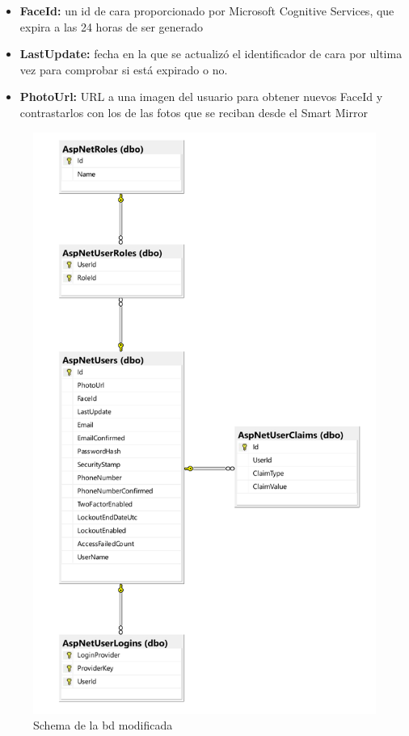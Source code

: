 \begin{itemize}
\item \textbf{FaceId:} un id de cara proporcionado por Microsoft Cognitive Services, que expira a las 24 horas de ser generado
\item \textbf{LastUpdate:} fecha en la que se actualizó el identificador de cara por ultima vez para comprobar si está expirado o no.
\item \textbf{PhotoUrl:} URL a una imagen del usuario para obtener nuevos FaceId y contrastarlos con los de las fotos que se reciban desde el Smart Mirror
\end{itemize}

\begin{figure}[!htp]
	\centering
	\includegraphics[angle=0, page=1, scale=.6]{fig/schema}
	\caption{Schema de la \acrshort{bd} modificada}
\end{figure}



